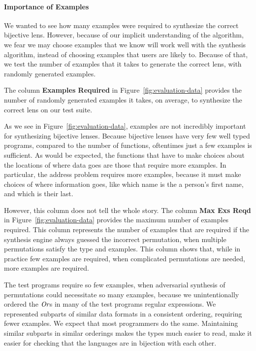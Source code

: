\documentclass[numbers,10pt,preprint\ifanon ,nocopyrightspace\fi]{sigplanconf}
\begin{document}
\paragraph*{Importance of Examples}

We wanted to see how many examples were required to synthesize the correct
bijective lens.
However, because of our implicit understanding of the algorithm, we fear we may
choose examples that we know will work well with the synthesis algorithm,
instead of choosing examples that users are likely to.
Because of that, we test the number of examples that it takes to generate the
correct lens, with randomly generated examples.

The column \textbf{Examples Required} in Figure~\ref{fig:evaluation-data}
provides the number of randomly generated examples it takes, on average, to
synthesize the correct lens on our test suite.  

As we see in Figure~\ref{fig:evaluation-data}, examples are not
incredibly
important for synthesizing bijective lenses.
Because bijective lenses have very few well typed programs, compared to the
number of functions, oftentimes just a few examples is sufficient.
As would be expected, the functions that have to make choices about the
locations of where data goes are those that require more examples.
In particular, the address problem requires more examples, because it must make
choices of where information goes, like which name is the a person's first name,
and which is their last.

However, this column does not tell the whole story.
The column \textbf{Max Exs Reqd} in Figure~\ref{fig:evaluation-data}
provides the maximum number of examples required.
This column represents the number of examples that are required if the
synthesis engine always guessed the incorrect permutation, when multiple
permutations satisfy the type and examples.
This column shows that, while in practice few examples are required,
when complicated permutations are needed, more examples are required.

The test programs require
so few examples, when adversarial synthesis of permutations could necessitate so
many examples, because we unintentionally ordered the $\textit{Or}$s in many of
the test programs regular expressions.
We represented subparts of similar data formats in a consistent ordering,
requiring fewer examples.  We expect that most programmers do the same.
Maintaining similar subparts in similar orderings makes the types much easier to
read, make it easier for checking that the languages are in bijection with each
other.
\end{document}
